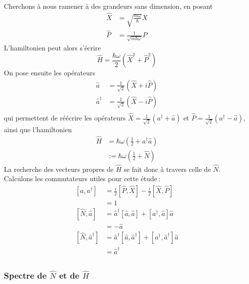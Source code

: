         Cherchons à nous ramener à des grandeurs sans dimension, en posant 
        \begin{align*}
            \hat{X} &= \sqrt{\frac{m\omega}{\hbar}}X \\
            \hat{P} &= \frac{1}{\sqrt{m\hbar\omega}}P
        \end{align*}
        L’hamiltonien peut alors s’écrire 
        \[ \hat{H} = \frac{\hbar\omega }{2}\left(\hat{X}^2 + \hat{P}^2\right) \]   
        On pose ensuite les opérateurs
        \begin{align*}
            \hat{a} &= \frac{1}{\sqrt{2}}\left(\hat{X} + i \hat{P}\right) \\
            \hat{a}^{\dagger} &= \frac{1}{\sqrt{2}}\left(\hat{X} - i \hat{P}\right) \\
        \end{align*}
        qui permettent de réécrire les opérateurs $\hat{X} = \frac{1}{\sqrt{2}}(a^{\dagger} + \hat{a})$ et $\hat{P}= \frac{1}{\sqrt{2}}(a^{\dagger} - \hat{a})$, ainsi que l’hamiltonien 
        \begin{align*}
            \hat{H} 
            &= \hbar \omega \left(\frac{1}{2} +  a^{\dagger} \hat{a}\right) \\
            &:= \hbar \omega \left(\frac{1}{2} + \hat{N}\right)
        \end{align*}
        La recherche des vecteurs propres de $\hat{H}$ se fait donc à travers celle de $\hat{N}$. Calculons les commutateurs utiles pour cette étude :
        \begin{align*}
            \left[a, a^{\dagger}\right] 
            &= \frac{i}{2} \left[\hat{P}, \hat{X}\right] - \frac{i}{2} \left[\hat{X}, \hat{P}\right]  \\
            &= 1 \\
            \left[\hat{N}, \hat{a}\right] 
            &= \hat{a}^{\dagger} \left[\hat{a}, \hat{a}\right] + \left[a^{\dagger}, \hat{a} \right] \hat{a} \\
            &= - \hat{a} \\
            \left[\hat{N}, \hat{a}^{\dagger}\right] 
            &= \hat{a}^{\dagger} \left[\hat{a}, \hat{a}^{\dagger}\right] + \left[a^{\dagger}, \hat{a}^{\dagger}\right] \hat{a} \\
            &= \hat{a}^{\dagger} \\
        \end{align*}

        \subsubsection{Spectre de $\hat{N}$ et de $\hat{H}$}

